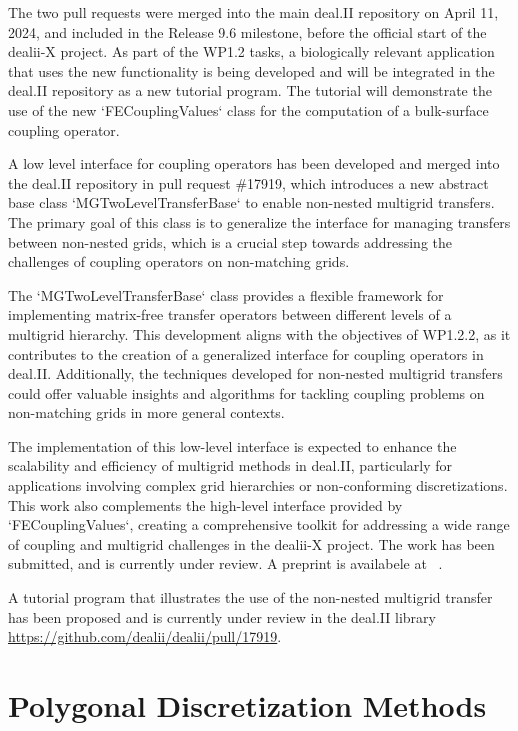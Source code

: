 \documentclass[a4paper,12pt]{article}
\begin{document}
    The two pull requests were merged into the main deal.II repository on April
    11, 2024, and included in the Release 9.6 milestone, before the official
    start of the dealii-X project. As part of the WP1.2 tasks, a biologically
    relevant application that uses the new functionality is being developed and
    will be integrated in the deal.II repository as a new tutorial program. The
    tutorial will demonstrate the use of the new `FECouplingValues` class for
    the computation of a bulk-surface coupling operator.

    A low level interface for coupling operators has been developed and merged
    into the deal.II repository in pull request \#17919, which introduces a new
    abstract base class `MGTwoLevelTransferBase` to enable non-nested multigrid
    transfers. The primary goal of this class is to generalize the interface for
    managing transfers between non-nested grids, which is a crucial step towards
    addressing the challenges of coupling operators on non-matching grids. 

    The `MGTwoLevelTransferBase` class provides a flexible framework for
    implementing matrix-free transfer operators between different levels of a
    multigrid hierarchy. This development aligns with the objectives of WP1.2.2,
    as it contributes to the creation of a generalized interface for coupling
    operators in deal.II. Additionally, the techniques developed for non-nested
    multigrid transfers could offer valuable insights and algorithms for
    tackling coupling problems on non-matching grids in more general contexts.

    The implementation of this low-level interface is expected to enhance the
    scalability and efficiency of multigrid methods in deal.II, particularly for
    applications involving complex grid hierarchies or non-conforming
    discretizations. This work also complements the high-level interface
    provided by `FECouplingValues`, creating a comprehensive toolkit for
    addressing a wide range of coupling and multigrid challenges in the dealii-X
    project. The work has been submitted, and is currently under review. A
    preprint is availabele at ~\cite{FederEtAl2024b}.

   A tutorial program that illustrates the use of the non-nested multigrid
   transfer has been proposed and is currently under review in the deal.II
   library
    \url{https://github.com/dealii/dealii/pull/17919}.


\section{Polygonal Discretization Methods}
\end{document}
